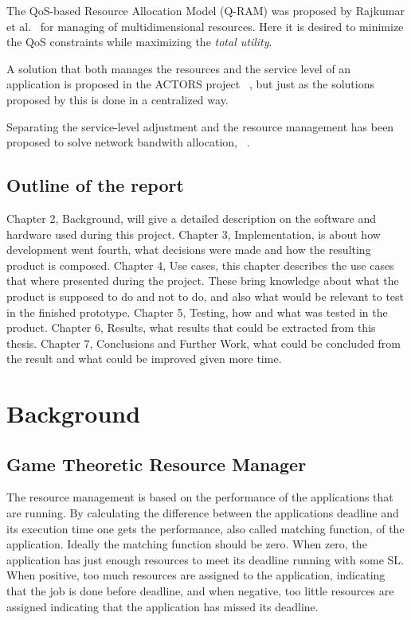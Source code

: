 \documentclass[nobiblatex]{LTHthesis}
\newcommand{\martina}[1]{\todo[inline,color=red!30,caption={}]{\textbf{Martina:} #1}}
\begin{document}
The QoS-based Resource Allocation Model (Q-RAM) was proposed by Rajkumar et al.~\cite{Raj97a} for managing of multidimensional resources. Here it is desired to minimize the QoS constraints while maximizing the \emph{total utility}. 
 
A solution that both manages the resources and the service level of an application is proposed in the ACTORS project ~\cite{Bin11}, but just as the solutions proposed by \cite{Raj97a,Soj11,Arz11} this is done in a centralized way. 

Separating the service-level adjustment and the resource management has been proposed to solve network bandwith allocation, ~\cite{Sil11}.


\martina{End of rephrase}

\section{Outline of the report}
Chapter 2, Background, will give a detailed description on the software and hardware used during this project.
Chapter 3, Implementation, is about how development went fourth, what decisions were made and how the resulting product is composed.
Chapter 4, Use cases, this chapter describes the use cases that where presented during the project. These bring knowledge about what the product is supposed to do and not to do, and also what would be relevant to test in the finished prototype.
Chapter 5, Testing, how and what was tested in the product.
Chapter 6, Results, what results that could be extracted from this thesis.
Chapter 7, Conclusions and Further Work, what could be concluded from the result and what could be improved given more time.
\chapter{Background}

\section{Game Theoretic Resource Manager}
The resource management is based on the performance of the applications that are running. By calculating the difference between the applications deadline and its execution time one gets the performance, also called matching function, of the application. Ideally the matching function should be zero. When zero, the  application has just enough resources to meet its deadline running with some SL. When positive, too much resources are assigned to the application, indicating that the job is done before deadline, and when negative, too little resources are assigned indicating that the application has missed its deadline.
\end{document}
